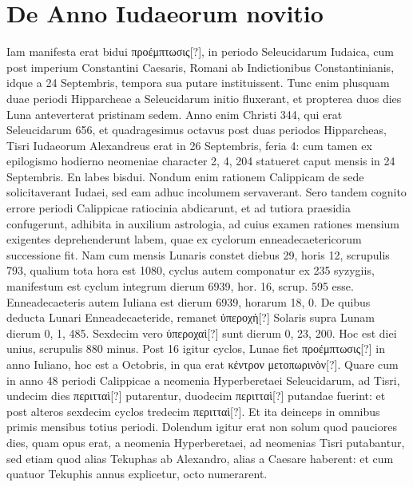 \section{De Anno Iudaeorum novitio}
%
Iam manifesta erat bidui \textgreek{προέμπτωσις[?]},
 in periodo Seleucidarum Iudaica,
cum post imperium Constantini Caesaris, Romani ab Indictionibus
Constantinianis, idque a 24 Septembris, tempora sua putare
instituissent.
Tunc enim plusquam duae periodi Hipparcheae a Seleucidarum
initio fluxerant, et propterea duos dies Luna anteverterat
pristinam sedem.
Anno enim Christi 344, qui erat Seleucidarum 656,
et quadragesimus octavus post duas periodos Hipparcheas, Tisri Iudaeorum
Alexandreus erat in 26 Septembris, feria 4: cum tamen ex epilogismo
hodierno neomeniae character 2, 4, 204 statueret caput
mensis in 24 Septembris.
En labes bisdui.
Nondum enim rationem Calippicam
de sede solicitaverant Iudaei, sed eam adhuc incolumem servaverant.
Sero tandem cognito errore periodi Calippicae ratiocinia abdicarunt,
et ad tutiora praesidia confugerunt, adhibita in auxilium
astrologia, ad cuius examen rationes mensium exigentes deprehenderunt
labem, quae ex cyclorum enneadecaetericorum successione fit.
Nam cum mensis Lunaris constet diebus 29, horis 12, scrupulis
793, qualium tota hora est 1080, cyclus autem componatur ex 235
syzygiis, manifestum est cyclum integrum dierum 6939, hor. 16, %
scrup. 595 esse. %
%
Enneadecaeteris autem Iuliana est dierum 6939,
horarum 18, 0.
De quibus deducta Lunari Enneadecaeteride, remanet
\textgreek{ὑπεροχὴ[?]} Solaris supra Lunam dierum 0, 1, 485.
Sexdecim vero
\textgreek{ὑπεροχαὶ[?]} sunt dierum 0, 23, 200.
Hoc est diei unius, scrupulis 880
minus.
Post 16 igitur cyclos, Lunae fiet \textgreek{προέμπτωσις[?]}
 in anno Iuliano,
hoc est a  Octobris, in qua erat \textgreek{κέντρον μετοπωρινὸν[?]}.
Quare
cum in anno 48 periodi Calippicae a neomenia Hyperberetaei Seleucidarum,
ad Tisri, undecim dies \textgreek{περιτταὶ[?]} putarentur, duodecim
\textgreek{περιτταὶ[?]} putandae fuerint:
 et post alteros sexdecim cyclos tredecim
\textgreek{περιτταὶ[?]}.
Et ita deinceps in omnibus primis mensibus totius periodi.
Dolendum igitur erat non solum quod pauciores dies, quam opus
erat, a neomenia Hyperberetaei, ad neomenias Tisri putabantur, sed
etiam quod alias Tekuphas ab Alexandro, alias a Caesare haberent:
et cum quatuor Tekuphis annus explicetur, octo numerarent.

